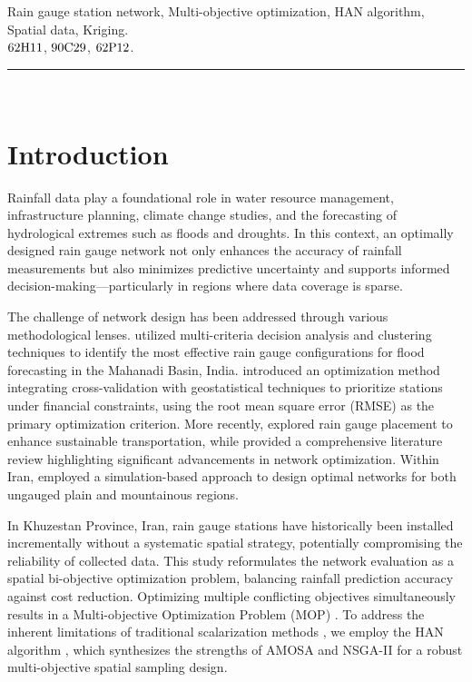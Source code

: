 \documentclass[10pt,twoside]{article}
\numberwithin{equation}{section}
\begin{document}
 


Rain gauge station network, Multi-objective optimization, HAN algorithm, Spatial data, Kriging. \\

 $\rm 62H11$, $\rm 90C29$, $\rm 62P12$. \\

\hspace{1cm}\rule{\textwidth}{0.2mm}\\

 


\section{Introduction}

 

Rainfall data play a foundational role in water resource management, infrastructure planning, climate change studies, and the forecasting of hydrological extremes such as floods and droughts. In this context, an optimally designed rain gauge network not only enhances the accuracy of rainfall measurements but also minimizes predictive uncertainty and supports informed decision-making—particularly in regions where data coverage is sparse.



The challenge of network design has been addressed through various methodological lenses. \cite{Kar:2015} utilized multi-criteria decision analysis and clustering techniques to identify the most effective rain gauge configurations for flood forecasting in the Mahanadi Basin, India. \cite{Ali:2018} introduced an optimization method integrating cross-validation with geostatistical techniques to prioritize stations under financial constraints, using the root mean square error (RMSE) as the primary optimization criterion. More recently, \cite{Simoyama:2022} explored rain gauge placement to enhance sustainable transportation, while \cite{Simoyama:2023} provided a comprehensive literature review highlighting significant advancements in network optimization. Within Iran, \cite{Zarei:2025} employed a simulation-based approach to design optimal networks for both ungauged plain and mountainous regions.



In Khuzestan Province, Iran, rain gauge stations have historically been installed incrementally without a systematic spatial strategy, potentially compromising the reliability of collected data. This study reformulates the network evaluation as a spatial bi-objective optimization problem, balancing rainfall prediction accuracy against cost reduction. Optimizing multiple conflicting objectives simultaneously results in a Multi-objective Optimization Problem (MOP) \citep{Ehrgott:2005}. To address the inherent limitations of traditional scalarization methods \citep{Fei:2017, Zhu:2006}, we employ the HAN algorithm \citep{Lotfian:2023}, which synthesizes the strengths of AMOSA \citep{Bandyopadhyay:2008} and NSGA-II \citep{Deb:2002} for a robust multi-objective spatial sampling design.
\end{document}
